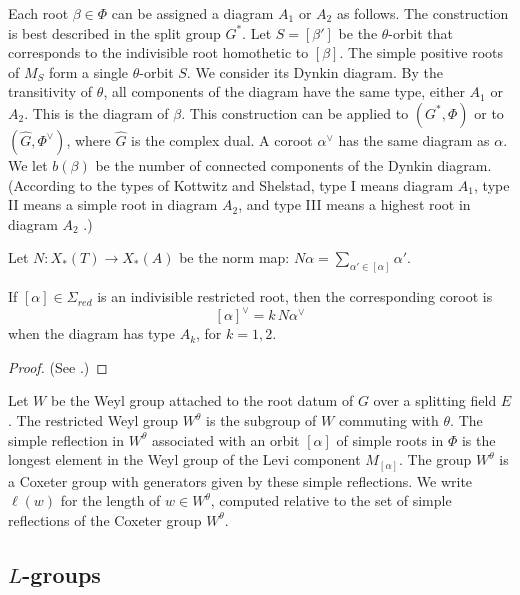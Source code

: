 Each root $\beta\in\Phi$ can be assigned a diagram $A_1$ or $A_2$ as
follows.  The construction is best described in the split group $G^*$.
Let $S=[\beta']$ be the $\theta$-orbit that corresponds to the
indivisible root homothetic to $[\beta]$.  The simple positive roots
of $M_S$ form a single $\theta$-orbit $S$.  We consider its Dynkin
diagram.  By the transitivity of $\theta$, all components of the
diagram have the same type, either $A_1$ or $A_2$.  This is the
diagram of $\beta$.  This construction can be applied to $(G^*,\Phi)$
or to $(\hat G,\Phi^\vee)$, where $\hat G$ is the complex dual.  A
coroot $\alpha^\vee$ has the same diagram as $\alpha$.  We let
$b(\beta)$ be the number of connected components of the Dynkin
diagram.  (According to the types of Kottwitz and Shelstad, type I
means diagram $A_1$, type II means a simple root in diagram $A_2$, and
type III means a highest root in diagram $A_2$
\cite{kottwitz1999foundations}.)

Let $N:X_*(T)\to X_*(A)$ be the norm map: 
$N\alpha = \sum_{\alpha'\in  [\alpha]} \alpha'$.

\begin{lemma}\label{lemma:norm}
 If $[\alpha]\in\Sigma_{red}$ is an indivisible restricted root, then
  the corresponding coroot is
\begin{equation}\label{eqn:norm}
[\alpha]^\vee = k\, N\alpha^\vee
\end{equation}
when the diagram has type $A_k$, for $k=1,2$.
\end{lemma}

\begin{proof}
(See \cite[1.3.9]{kottwitz1999foundations}.)
\end{proof}

Let $W$ be the Weyl group attached to the root datum of $G$ over a
splitting field $E$.  The restricted Weyl group $W^\theta$ is the
subgroup of $W$ commuting with $\theta$.  The simple reflection in
$W^\theta$ associated with an orbit $[\alpha]$ of simple roots in
$\Phi$ is the longest element in the Weyl group of the Levi component
$M_{[\alpha]}$.  The group $W^\theta$ is a Coxeter group with
generators given by these simple reflections.  We write $\ell(w)$ for
the length of $w\in W^\theta$, computed relative to the set of simple
reflections of the Coxeter group $W^\theta$.

\subsection{$L$-groups}

